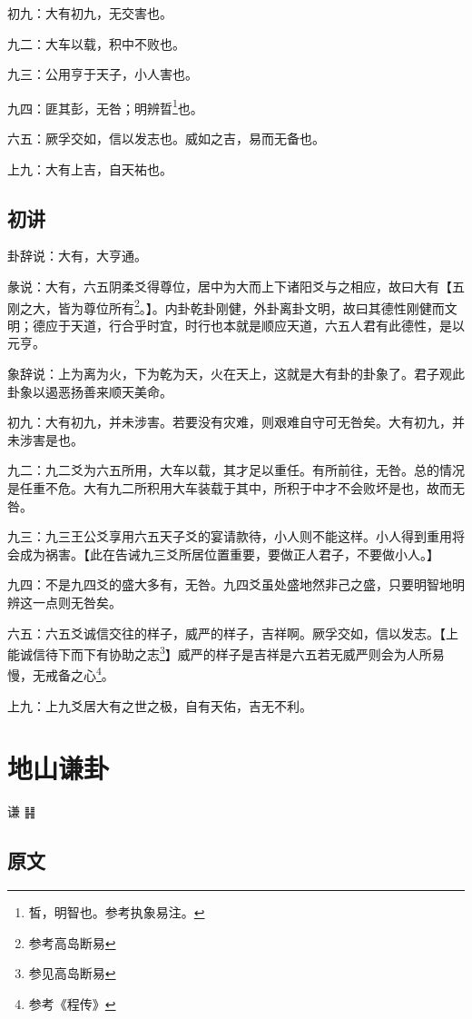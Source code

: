 \documentclass[12pt,oneside]{book}
\begin{document}
初九：大有初九，无交害也。

九二：大车以载，积中不败也。

九三：公用亨于天子，小人害也。

九四：匪其彭，无咎；明辨晢\footnote{皙，明智也。参考执象易注。}也。

六五：厥孚交如，信以发志也。威如之吉，易而无备也。

上九：大有上吉，自天祐也。


\section{初讲}
卦辞说：大有，大亨通。

彖说：大有，六五阴柔爻得尊位，居中为大而上下诸阳爻与之相应，故曰大有【五刚之大，皆为尊位所有\footnote{参考高岛断易}。】。内卦乾卦刚健，外卦离卦文明，故曰其德性刚健而文明；德应于天道，行合乎时宜，时行也本就是顺应天道，六五人君有此德性，是以元亨。

象辞说：上为离为火，下为乾为天，火在天上，这就是大有卦的卦象了。君子观此卦象以遏恶扬善来顺天美命。

初九：大有初九，并未涉害。若要没有灾难，则艰难自守可无咎矣。大有初九，并未涉害是也。

九二：九二爻为六五所用，大车以载，其才足以重任。有所前往，无咎。总的情况是任重不危。大有九二所积用大车装载于其中，所积于中才不会败坏是也，故而无咎。

九三：九三王公爻享用六五天子爻的宴请款待，小人则不能这样。小人得到重用将会成为祸害。【此在告诫九三爻所居位置重要，要做正人君子，不要做小人。】

九四：不是九四爻的盛大多有，无咎。九四爻虽处盛地然非己之盛，只要明智地明辨这一点则无咎矣。

六五：六五爻诚信交往的样子，威严的样子，吉祥啊。厥孚交如，信以发志。【上能诚信待下而下有协助之志\footnote{参见高岛断易}】威严的样子是吉祥是六五若无威严则会为人所易慢，无戒备之心\footnote{参考《程传》}。

上九：上九爻居大有之世之极，自有天佑，吉无不利。



\chapter{地山谦卦}
谦 {\Large ䷎}

\section{原文}
\end{document}
